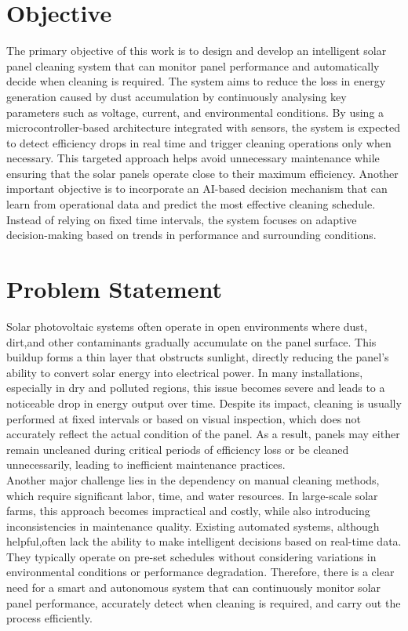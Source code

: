 \documentclass[10pt]{report}
\begin{document}
\begin{sloppypar}
{{{\begin{sloppypar}
\section{Objective}
\hspace{0.5cm}
The primary objective of this work is to design and develop an intelligent solar
panel cleaning system that can monitor panel performance and automatically decide when cleaning is required. The system aims to reduce the loss in energy generation caused by dust accumulation by continuously analysing key parameters such as voltage, current, and environmental conditions. By using a microcontroller-based architecture integrated with sensors, the system is expected to detect efficiency drops in real time and trigger cleaning operations only when necessary. This targeted approach helps avoid unnecessary maintenance while ensuring that the solar panels
operate close to their maximum efficiency. Another important objective is to incorporate an AI-based decision mechanism that can learn from operational data and predict the most effective cleaning schedule. Instead of relying on fixed time intervals, the system focuses on adaptive decision-making based on trends in performance and surrounding conditions.

\section{Problem Statement}
\hspace{0.5cm}
Solar photovoltaic systems often operate in open environments where dust, dirt,and other contaminants gradually accumulate on the panel surface. This buildup forms a thin layer that obstructs sunlight, directly reducing the panel’s ability to convert solar energy into electrical power. In many installations, especially in dry and polluted regions, this issue becomes severe and leads to a noticeable drop in energy output over time. Despite its impact, cleaning is usually performed at fixed intervals or based on visual inspection, which does not accurately reflect the actual condition of the panel. As a result, panels may either remain uncleaned during critical periods of efficiency loss or be cleaned unnecessarily, leading to inefficient maintenance practices. \\

Another major challenge lies in the dependency on manual cleaning
methods, which require significant labor, time, and water resources. In large-scale solar farms, this approach becomes impractical and costly, while also introducing inconsistencies in maintenance quality. Existing automated systems, although helpful,often lack the ability to make intelligent decisions based on real-time data. They typically operate on pre-set schedules without considering variations in environmental
conditions or performance degradation. Therefore, there is a clear need for a smart and autonomous system that can continuously monitor solar panel performance, accurately detect when cleaning is required, and carry out the process efficiently.



\end{sloppypar}}}}
\end{sloppypar}
\end{document}
